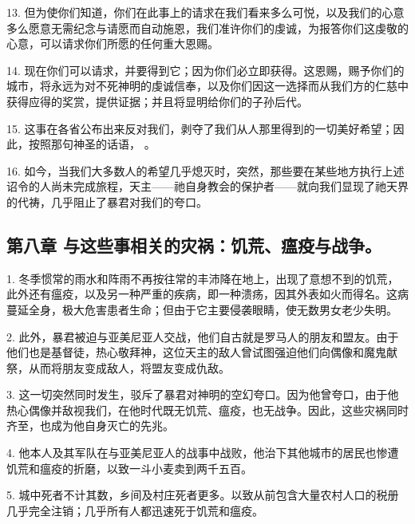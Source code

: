 13. 但为使你们知道，你们在此事上的请求在我们看来多么可悦，以及我们的心意多么愿意无需纪念与请愿而自动施恩，我们准许你们的虔诚，为报答你们这虔敬的心意，可以请求你们所愿的任何重大恩赐。\par

14. 现在你们可以请求，并要得到它；因为你们必立即获得。这恩赐，赐予你们的城市，将永远为对不死神明的虔诚信奉，以及你们因这一选择而从我们方的仁慈中获得应得的奖赏，提供证据；并且将显明给你们的子孙后代。\par

15. 这事在各省公布出来反对我们，剥夺了我们从人那里得到的一切美好希望；因此，按照那句神圣的话语， 。\par

16. 如今，当我们大多数人的希望几乎熄灭时，突然，那些要在某些地方执行上述诏令的人尚未完成旅程，天主——祂自身教会的保护者——就向我们显现了祂天界的代祷，几乎阻止了暴君对我们的夸口。\par


\subsection{第八章 与这些事相关的灾祸：饥荒、瘟疫与战争。}

1. 冬季惯常的雨水和阵雨不再按往常的丰沛降在地上，出现了意想不到的饥荒，此外还有瘟疫，以及另一种严重的疾病，即一种溃疡，因其外表如火而得名。这病蔓延全身，极大危害患者生命；但由于它主要侵袭眼睛，使无数男女老少失明。\par

2. 此外，暴君被迫与亚美尼亚人交战，他们自古就是罗马人的朋友和盟友。由于他们也是基督徒，热心敬拜神，这位天主的敌人曾试图强迫他们向偶像和魔鬼献祭，从而将朋友变成敌人，将盟友变成仇敌。\par

3. 这一切突然同时发生，驳斥了暴君对神明的空幻夸口。因为他曾夸口，由于他热心偶像并敌视我们，在他时代既无饥荒、瘟疫，也无战争。因此，这些灾祸同时齐至，也成为他自身灭亡的先兆。\par

4. 他本人及其军队在与亚美尼亚人的战事中战败，他治下其他城市的居民也惨遭饥荒和瘟疫的折磨，以致一斗小麦卖到两千五百。\par

5. 城中死者不计其数，乡间及村庄死者更多。以致从前包含大量农村人口的税册几乎完全注销；几乎所有人都迅速死于饥荒和瘟疫。\par

